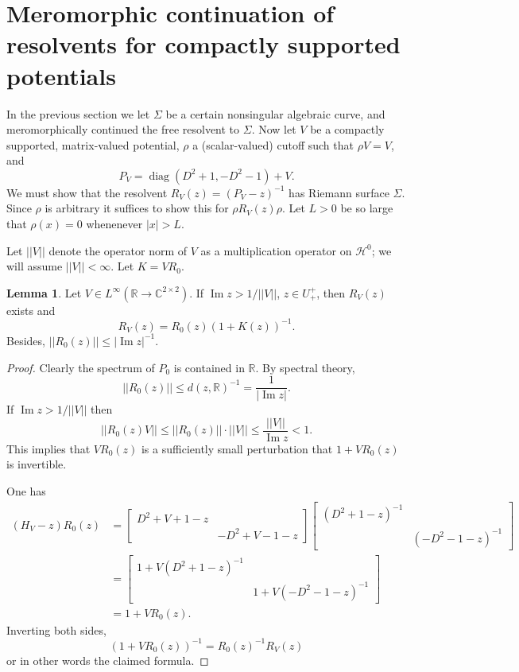 \documentclass[12pt]{report}
\newcommand{\RR}{\mathbb{R}}
\newcommand{\CC}{\mathbb{C}}
\DeclareMathOperator{\diag}{diag}
\renewcommand{\Im}{\operatorname{Im}}
\theoremstyle{definition}
\newtheorem{lemma}[theorem]{Lemma}
\begin{document}
\section{Meromorphic continuation of resolvents for compactly supported potentials}
In the previous section we let $\Sigma$ be a certain nonsingular algebraic curve, and meromorphically continued the free resolvent to $\Sigma$.
Now let $V$ be a compactly supported, matrix-valued potential, $\rho$ a (scalar-valued) cutoff such that $\rho V = V$, and
$$P_V = \diag(D^2 + 1, -D^2 - 1) + V.$$
We must show that the resolvent $R_V(z) = (P_V - z)^{-1}$ has Riemann surface $\Sigma$.
Since $\rho$ is arbitrary it suffices to show this for $\rho R_V(z) \rho$.
Let $L > 0$ be so large that $\rho(x) = 0$ whenenever $|x| > L$.

Let $||V||$ denote the operator norm of $V$ as a multiplication operator on $\mathcal H^0$; we will assume $||V|| < \infty$.
Let $K = VR_0$.

\begin{lemma}
Let $V \in L^\infty(\RR \to \CC^{2 \times 2})$.
If $\Im z > 1/||V||$, $z \in U^+_+$, then $R_V(z)$ exists and
$$R_V(z) = R_0(z)(1 + K(z))^{-1}.$$
Besides, $||R_0(z)|| \leq |\Im z|^{-1}$.
\end{lemma}
\begin{proof}
Clearly the spectrum of $P_0$ is contained in $\RR$.
By spectral theory,
$$||R_0(z)|| \leq d(z, \RR)^{-1} = \frac{1}{|\Im z|}.$$
If $\Im z > 1/||V||$ then
$$||R_0(z)V|| \leq ||R_0(z)||\cdot ||V|| \leq \frac{||V||}{\Im z} < 1.$$
This implies that $VR_0(z)$ is a sufficiently small perturbation that $1 + VR_0(z)$ is invertible.

One has
\begin{align*}(H_V - z)R_0(z) &= \begin{bmatrix}D^2 + V + 1 - z\\& -D^2 + V - 1 - z\end{bmatrix}\begin{bmatrix}(D^2 + 1 - z)^{-1}\\&(-D^2-1-z)^{-1}\end{bmatrix}\\
 &= \begin{bmatrix}1 + V(D^2 + 1 - z)^{-1}\\&1 + V(-D^2 - 1 - z)^{-1}\end{bmatrix}
 \\& = 1 + VR_0(z).
 \end{align*}
Inverting both sides,
$$(1 + VR_0(z))^{-1} = R_0(z)^{-1}R_V(z)$$
or in other words the claimed formula.
\end{proof}
\end{document}
